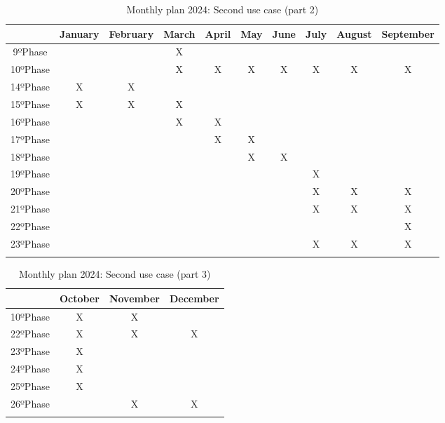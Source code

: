 \begin{longtable}{| c | c | c | c | c | c | c | c | c | c |}
    \hline
    & \textbf{January} & \textbf{February} & \textbf{March} & \textbf{April} & \textbf{May} & \textbf{June} & \textbf{July} & \textbf{August} & \textbf{September}\\ \hline
    9ºPhase &  &  & X &  &  &  &  &  &  \\ \hline
    
    10ºPhase &  &  & X & X & X & X & X & X & X \\ \hline

    14ºPhase & X & X &  &  &  &  &  &  &  \\ \hline
    
    15ºPhase & X & X & X &  &  &  &  &  &  \\ \hline

    16ºPhase &  &  & X & X &  &  &  &  &  \\ \hline

    17ºPhase &  &  &  & X & X &  &  &  &  \\ \hline

    18ºPhase &  &  &  &  & X & X &  &  &  \\ \hline

    19ºPhase &  &  &  &  & & & X &  &  \\ \hline

    20ºPhase &  &  &  &  & & & X & X & X  \\ \hline

    21ºPhase &  &  &  &  & & & X & X & X  \\ \hline

    22ºPhase &  &  &  &  & & & & & X  \\ \hline
    
    23ºPhase &  &  &  &  &  &  & X &  X & X\\ \hline

    \caption{Monthly plan 2024: Second use case (part 2)} \label{tab:activity_schedule} 
\end{longtable}

\begin{longtable}{| c | c | c | c |}
\hline
& \textbf{October} & \textbf{November} & \textbf{December} \\ \hline

    10ºPhase & X & X &   \\ \hline

    22ºPhase & X & X & X   \\ \hline
    
    23ºPhase & X &  &   \\ \hline

    24ºPhase & X &  &   \\ \hline

    25ºPhase & X &  &   \\ \hline

    26ºPhase &  & X & X  \\ \hline
    \caption{Monthly plan 2024: Second use case (part 3)} \label{tab:activity_schedule} 
\end{longtable}


